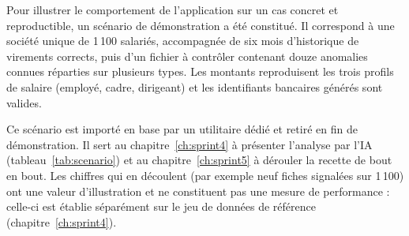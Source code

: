 Pour illustrer le comportement de l'application sur un cas concret et reproductible, un scénario de démonstration a été constitué. Il correspond à une société unique de 1\,100 salariés, accompagnée de six mois d'historique de virements corrects, puis d'un fichier à contrôler contenant douze anomalies connues réparties sur plusieurs types. Les montants reproduisent les trois profils de salaire (employé, cadre, dirigeant) et les identifiants bancaires générés sont valides.

Ce scénario est importé en base par un utilitaire dédié et retiré en fin de démonstration. Il sert au chapitre~\ref{ch:sprint4} à présenter l'analyse par l'IA (tableau~\ref{tab:scenario}) et au chapitre~\ref{ch:sprint5} à dérouler la recette de bout en bout. Les chiffres qui en découlent (par exemple neuf fiches signalées sur 1\,100) ont une valeur d'illustration et ne constituent pas une mesure de performance : celle-ci est établie séparément sur le jeu de données de référence (chapitre~\ref{ch:sprint4}).
